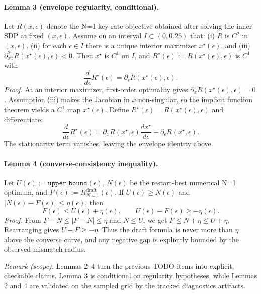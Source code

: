 \documentclass[a4paper,twocolumn,11pt,unpublished]{quantumarticle}
\begin{document}
\paragraph{Lemma 3 (envelope regularity, conditional).}
Let $R(x,\epsilon)$ denote the N=1 key-rate objective obtained after solving
the inner SDP at fixed $(x,\epsilon)$. Assume on an interval
$I\subset(0,0.25)$ that:
(i) $R$ is $C^2$ in $(x,\epsilon)$,
(ii) for each $\epsilon\in I$ there is a unique interior maximizer
$x^\star(\epsilon)$, and
(iii) $\partial^2_{xx}R(x^\star(\epsilon),\epsilon)<0$.
Then $x^\star$ is $C^1$ on $I$, and
$R^\star(\epsilon):=R(x^\star(\epsilon),\epsilon)$ is $C^1$ with
\begin{equation}
\frac{d}{d\epsilon}R^\star(\epsilon)=
\partial_\epsilon R(x^\star(\epsilon),\epsilon).
\end{equation}
{\color{magenta}
\textit{Proof.}
At an interior maximizer, first-order optimality gives
$\partial_x R(x^\star(\epsilon),\epsilon)=0$.
Assumption (iii) makes the Jacobian in $x$ non-singular, so the implicit
function theorem yields a $C^1$ map $x^\star(\epsilon)$.
Define $R^\star(\epsilon)=R(x^\star(\epsilon),\epsilon)$ and differentiate:
\[
\frac{d}{d\epsilon}R^\star(\epsilon)=
\partial_x R(x^\star,\epsilon)\frac{dx^\star}{d\epsilon}+
\partial_\epsilon R(x^\star,\epsilon).
\]
The stationarity term vanishes, leaving the envelope identity above.
}

\paragraph{Lemma 4 (converse-consistency inequality).}
Let $U(\epsilon):=\texttt{upper\_bound}(\epsilon)$,
$N(\epsilon)$ be the restart-best numerical N=1 optimum, and
$F(\epsilon):=R_{N=1}^{\mathrm{draft}}(\epsilon)$. If
$U(\epsilon)\ge N(\epsilon)$ and
$|N(\epsilon)-F(\epsilon)|\le \eta(\epsilon)$, then
\begin{equation}
F(\epsilon)\le U(\epsilon)+\eta(\epsilon),\qquad
U(\epsilon)-F(\epsilon)\ge -\eta(\epsilon).
\end{equation}
{\color{magenta}
\textit{Proof.}
From $F-N\le |F-N|\le \eta$ and $N\le U$, we get
$F\le N+\eta\le U+\eta$.
Rearranging gives $U-F\ge -\eta$.
Thus the draft formula is never more than $\eta$ above the converse curve, and
any negative gap is explicitly bounded by the observed mismatch radius.
}

{\color{magenta}
\textit{Remark (scope).}
Lemmas 2--4 turn the previous TODO items into explicit, checkable claims.
Lemma 3 is conditional on regularity hypotheses, while Lemmas 2 and 4 are
validated on the sampled grid by the tracked diagnostics artifacts.
}
\end{document}
